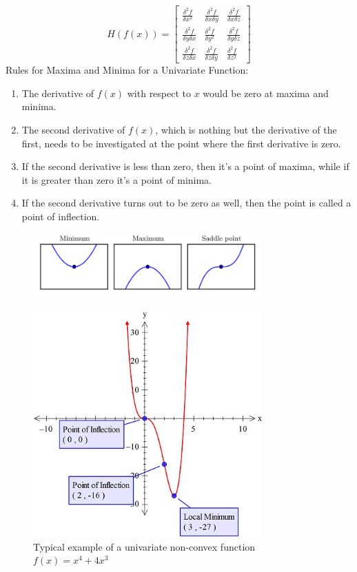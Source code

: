 \documentclass{report}
\begin{document}
$$
H(f(x))=\left[\begin{array}{ccc}
\frac{\delta^2 f}{\delta x^2} & \frac{\delta^2 f}{\delta x \delta y} & \frac{\delta^2 f}{\delta x \delta z} \\
\frac{\delta^2 f}{\delta y \delta x} & \frac{\delta^2 f}{\delta y^2} & \frac{\delta^2 f}{\delta y \delta z} \\
\frac{\delta^2 f}{\delta z \delta x} & \frac{\delta^2 f}{\delta z \delta y} & \frac{\delta^2 f}{\delta z^2}
\end{array}\right]
$$
Rules for Maxima and Minima for a Univariate Function:
\begin{enumerate}
	\item The derivative of $f(x)$ with respect to $x$ would be zero at maxima and minima. 
	\item The second derivative of $f(x)$, which is nothing but the derivative of the first, needs to be investigated at the point where the first derivative is zero. 
	\item If the second derivative is less than zero, then it’s a point of maxima, while if it is greater than zero it’s a point of minima.  
	\item If the second derivative turns out to be zero as well, then the point is called a point of inflection. 
\end{enumerate}

\begin{figure}[ht]
	\includegraphics[width=250pt]{12}
	\centering
\end{figure}

\begin{figure}[ht]
	\includegraphics[width=250pt]{13}
	\centering
	\caption{Typical example of a univariate non-convex function $f(x) = x^4 + 4x^3$}
\end{figure}
\end{document}
